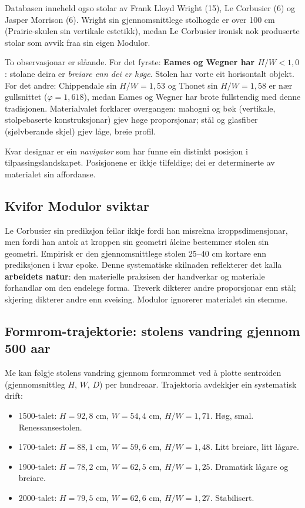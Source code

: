 \documentclass[10pt, a4paper, twocolumn]{article}
\begin{document}
Databasen inneheld ogso stolar av Frank Lloyd Wright (15), Le Corbusier (6) og Jasper Morrison (6). Wright sin gjennomsnittlege stolhogde er over 100 cm (Prairie-skulen sin vertikale estetikk), medan Le Corbusier ironisk nok produserte stolar som avvik fraa sin eigen Modulor.

To observasjonar er slåande. For det fyrste: \textbf{Eames og Wegner har $H/W < 1{,}0$}: stolane deira er \emph{breiare enn dei er høge}. Stolen har vorte eit horisontalt objekt. For det andre: Chippendale sin $H/W = 1{,}53$ og Thonet sin $H/W = 1{,}58$ er nær gullsnittet ($\varphi = 1{,}618$), medan Eames og Wegner har brote fullstendig med denne tradisjonen. Materialvalet forklarer overgangen: mahogni og bøk (vertikale, stolpebaserte konstruksjonar) gjev høge proporsjonar; stål og glasfiber (sjølvberande skjel) gjev låge, breie profil.

Kvar designar er ein \emph{navigator} som har funne ein distinkt posisjon i tilpassingslandskapet. Posisjonene er ikkje tilfeldige; dei er determinerte av materialet sin affordanse.

\subsection{Kvifor Modulor sviktar}

Le Corbusier sin prediksjon feilar ikkje fordi han misrekna kroppsdimensjonar, men fordi han antok at kroppen sin geometri åleine bestemmer stolen sin geometri. Empirisk er den gjennomsnittlege stolen 25--40 cm kortare enn prediksjonen i kvar epoke. Denne systematiske skilnaden reflekterer det \citet{pye1968} kalla \textbf{arbeidets natur}: den materielle praksisen der handverkar og materiale forhandlar om den endelege forma. Treverk dikterer andre proporsjonar enn stål; skjering dikterer andre enn sveising. Modulor ignorerer materialet sin stemme.

\subsection{Formrom-trajektorie: stolens vandring gjennom 500 aar}

Me kan følgje stolens vandring gjennom formrommet ved å plotte sentroiden (gjennomsnittleg $H$, $W$, $D$) per hundreaar. Trajektoria avdekkjer ein systematisk drift:

\begin{itemize}
  \item 1500-talet: $H = 92{,}8$ cm, $W = 54{,}4$ cm, $H/W = 1{,}71$. Høg, smal. Renessansestolen.
  \item 1700-talet: $H = 88{,}1$ cm, $W = 59{,}6$ cm, $H/W = 1{,}48$. Litt breiare, litt lågare.
  \item 1900-talet: $H = 78{,}2$ cm, $W = 62{,}5$ cm, $H/W = 1{,}25$. Dramatisk lågare og breiare.
  \item 2000-talet: $H = 79{,}5$ cm, $W = 62{,}6$ cm, $H/W = 1{,}27$. Stabilisert.
\end{itemize}
\end{document}
